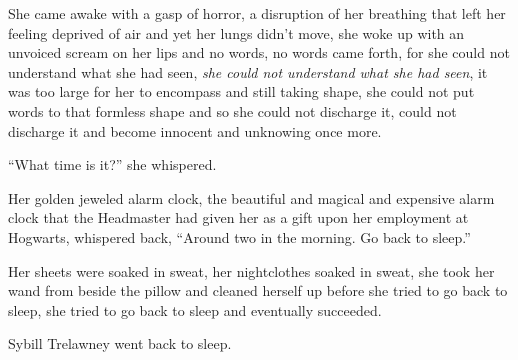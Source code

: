 She came awake with a gasp of horror, a disruption of her breathing that left her feeling deprived of air and yet her lungs didn't move, she woke up with an unvoiced scream on her lips and no words, no words came forth, for she could not understand what she had seen, \emph{she could not understand what she had seen}, it was too large for her to encompass and still taking shape, she could not put words to that formless shape and so she could not discharge it, could not discharge it and become innocent and unknowing once more.

``What time is it?'' she whispered.

Her golden jeweled alarm clock, the beautiful and magical and expensive alarm clock that the Headmaster had given her as a gift upon her employment at Hogwarts, whispered back, ``Around two in the morning. Go back to sleep.''

Her sheets were soaked in sweat, her nightclothes soaked in sweat, she took her wand from beside the pillow and cleaned herself up before she tried to go back to sleep, she tried to go back to sleep and eventually succeeded.

Sybill Trelawney went back to sleep.
